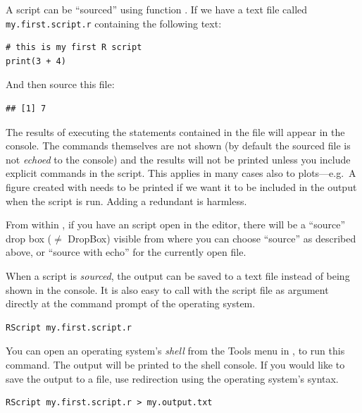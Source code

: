 \documentclass[krantz2]{krantz}\usepackage{knitr}%
\begin{document}
A script can be ``sourced'' using function . If we have a text file called \texttt{my.first.script.r} containing the following text:
\begin{shaded}
\footnotesize
\begin{verbatim}
# this is my first R script
print(3 + 4)
\end{verbatim}
\end{shaded}

And then source this file:

\begin{knitrout}\footnotesize
{}\color{fgcolor}\begin{kframe}
\begin{alltt}
\hlstd{(}\hlstd{)}
\end{alltt}
\begin{verbatim}
## [1] 7
\end{verbatim}
\end{kframe}
\end{knitrout}

The results of executing the statements contained in the file will appear in the console. The commands themselves are not shown (by default the sourced file is not \emph{echoed} to the console) and the results will not be printed unless you include explicit  commands in the script. This applies in many cases also to plots---e.g.\ A figure created with  needs to be printed if we want it to be included in the output when the script is run. Adding a redundant  is harmless.

From within \RStudio, if you have an \Rpgrm script open in the editor, there will be a ``source'' drop box ($\neq$ DropBox) visible from where you can choose ``source'' as described above, or ``source with echo'' for the currently open file.

When a script is \emph{sourced}, the output can be saved to a text file instead of being shown in the console. It is also easy to call \Rpgrm with the script file as argument directly at the command prompt of the operating system.
\begin{shaded}
\footnotesize
\begin{verbatim}
RScript my.first.script.r
\end{verbatim}
\end{shaded}

You can open an operating system's \emph{shell} from the Tools menu in \RStudio, to run this command. The output will be printed to the shell console. If you would like to save the output to a file, use redirection using the operating system's syntax.
\begin{shaded}
\footnotesize
\begin{verbatim}
RScript my.first.script.r > my.output.txt
\end{verbatim}
\end{shaded}
\end{document}

